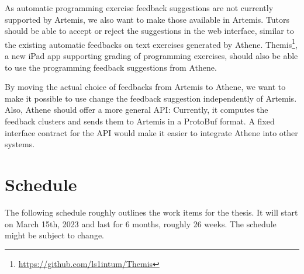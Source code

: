 As automatic programming exercise feedback suggestions are not currently supported by Artemis, we also want to make those available in Artemis. Tutors should be able to accept or reject the suggestions in the web interface, similar to the existing automatic feedbacks on text exercises generated by Athene. Themis\footnote{\url{https://github.com/ls1intum/Themis}}, a new iPad app supporting grading of programming exercises, should also be able to use the programming feedback suggestions from Athene.

By moving the actual choice of feedbacks from Artemis to Athene, we want to make it possible to use change the feedback suggestion independently of Artemis. Also, Athene should offer a more general API: Currently, it computes the feedback clusters and sends them to Artemis in a ProtoBuf format. A fixed interface contract for the API would make it easier to integrate Athene into other systems.


\section*{Schedule}

The following schedule roughly outlines the work items for the thesis. It will start on March 15th, 2023 and last for 6 months, roughly 26 weeks. The schedule might be subject to change.

